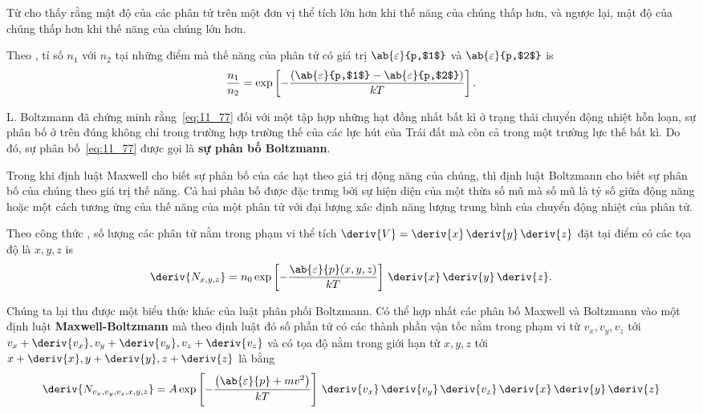 Từ  cho thấy rằng mật độ của các phân tử trên một đơn vị thể tích lớn hơn khi thế năng của chúng thấp hơn, và ngược lại, mật độ của chúng thấp hơn khi thế năng của chúng lớn hơn.

Theo , tỉ số $n_1$ với $n_2$ tại những điểm mà thế năng của phân tử có giá trị $\ab{\varepsilon}{p,$1$}$ và $\ab{\varepsilon}{p,$2$}$ is
\begin{equation}\label{eq:11_78}
	\frac{n_1}{n_2} =  \exp\left[-\frac{\left(\ab{\varepsilon}{p,$1$} - \ab{\varepsilon}{p,$2$}\right)}{kT}\right].
\end{equation}

\noindent
L. Boltzmann đã chứng minh rằng~\eqref{eq:11_77} đối với một tập hợp những hạt đồng nhất bất kì ở trạng thái chuyển động nhiệt hỗn loạn, sự phân bố ở trên đúng không chỉ trong trường hợp trường thế của các lực hút của Trái đất mà còn cả trong một trường lực thế bất kì. Do đó, sự phân bố~\eqref{eq:11_77} được gọi là \textbf{sự phân bố Boltzmann}.

Trong khi định luật Maxwell cho biết sự phân bố của các hạt theo giá trị động năng của chúng, thì định luật Boltzmann cho biết sự phân bố của chúng theo giá trị thế năng. Cả hai phân bố được đặc trưng bởi sự hiện diện của một thừa số mũ mà số mũ là tỷ số giữa động năng hoặc một cách tương ứng của thế năng của một phân tử với đại lượng xác định năng lượng trung bình của chuyển động nhiệt của phân tử.

Theo công thức , số lượng các phân tử nằm trong phạm vi thể tích $\deriv{V}=\deriv{x}\,\deriv{y}\,\deriv{z}$ đặt tại điểm có các tọa độ là $x, y, z$ is
\begin{equation}\label{eq:11_79}
	\deriv{N_{x,y,z}} = n_0 \exp\left[-\frac{\ab{\varepsilon}{p}(x,y,z)}{kT}\right]\,\deriv{x}\,\deriv{y}\,\deriv{z}.
\end{equation}

\noindent
Chúng ta lại thu được một biểu thức khác của luật phân phối Boltzmann.
Có thể hợp nhất các phân bố Maxwell và Boltzmann vào một định luật \textbf{Maxwell-Boltzmann} mà theo định luật đó số phần tử có các thành phần vận tốc nằm trong phạm vi từ $v_x, v_y, v_z$ tới $v_x+\deriv{v_x}, v_y+\deriv{v_y}, v_z+\deriv{v_z}$ và có tọa độ nằm trong giới hạn từ $x, y, z$ tới $x+\deriv{x}, y+\deriv{y}, z+\deriv{z}$ là bằng
\begin{equation}\label{eq:11_80}
	\deriv{N_{v_x,v_y,v_z,x,y,z}} = A \exp\left[-\frac{\left(\ab{\varepsilon}{p}+mv^2\right)}{kT}\right]\,\deriv{v_x}\,\deriv{v_y}\,\deriv{v_z}\,\deriv{x}\,\deriv{y}\,\deriv{z}
\end{equation}

